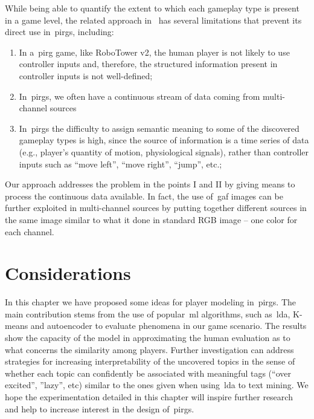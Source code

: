While being able to quantify the extent to which each gameplay type is present in a game level, the related approach in~\cite{smith_mining_2016} has several limitations that prevent its direct use in~\gls{pirg}s, including:

\begin{enumerate}[label=\Roman*.]
    \item In a~\gls{pirg} game, like RoboTower v2, the human player is not likely to use controller inputs and, therefore, the structured information present in controller inputs is not well-defined;
    \item In~\gls{pirg}s, we often have a continuous stream of data coming from multi-channel sources %
    \item In~\gls{pirg}s the difficulty to assign semantic meaning to some of the discovered gameplay types is high, since the source of information is a time series of data (e.g., player's quantity of motion, physiological signals), rather than controller inputs such as ``move left'', ``move right'', ``jump'', etc.;
\end{enumerate}

Our approach addresses the problem in the points I and II by giving means to process the continuous data available. In fact, the use of~\gls{gaf} images can be further exploited in multi-channel sources by putting together different sources in the same image similar to what it done in standard RGB image -- one color for each channel. 


\section{Considerations}
In this chapter we have proposed some ideas for player modeling in~\gls{pirg}s. The main contribution stems from the use of popular~\gls{ml} algorithms, such as~\gls{lda}, K-means and autoencoder to evaluate phenomena in our game scenario. The results show the capacity of the model in approximating the human evaluation as to what concerns the similarity among players. Further investigation can address strategies for increasing interpretability of the uncovered topics in the sense of whether each topic can confidently be associated with meaningful tags (\eg ``over excited'', ''lazy'', etc) similar to the ones given when using~\gls{lda} to text mining. We hope the experimentation detailed in this chapter will inspire further research and help to increase interest  in the design of~\gls{pirg}s.
